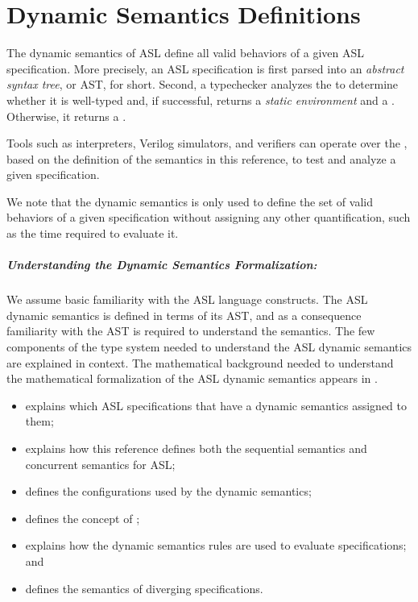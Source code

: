 \chapter{Dynamic Semantics Definitions\label{chap:Semantics}}

The dynamic semantics of ASL define all valid behaviors of a given ASL specification.
More precisely, an ASL specification is first parsed into an \emph{abstract syntax tree},
or AST, for short. Second, a typechecker analyzes the \emph{\untypedast} to determine whether it
is well-typed and, if successful, returns a \emph{static environment} and a \emph{\typedast}.
Otherwise, it returns a \typingerrorterm{}.

Tools such as interpreters, Verilog simulators, and verifiers can operate over the \typedast,
based on the definition of the semantics in this reference, to test and analyze a given specification.

We note that the dynamic semantics is only used to define the set of valid behaviors
of a given specification without assigning any other quantification, such as the time
required to evaluate it.

\paragraph{Understanding the Dynamic Semantics Formalization:}
We assume basic familiarity with the ASL language constructs.
The ASL dynamic semantics is defined in terms of its AST,
and as a consequence familiarity with the AST is required to understand the semantics.
The few components of the type system needed to understand the ASL dynamic semantics are explained in context.
The mathematical background needed to understand the mathematical formalization
of the ASL dynamic semantics appears in .

\ChapterOutline
\begin{itemize}
  \item {} explains which ASL specifications that have a dynamic semantics
        assigned to them;
  \item {} explains how this reference defines both the
        sequential semantics and concurrent semantics for ASL;
  \item {} defines the configurations used by the dynamic semantics;
  \item {} defines the concept of \nativevalues{};
  \item {} explains how the dynamic semantics rules are used to evaluate specifications; and
  \item {} defines the semantics of diverging specifications.
\end{itemize}

